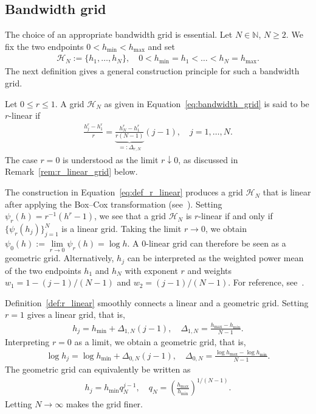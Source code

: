 \subsection{Bandwidth grid}

The choice of an appropriate bandwidth grid is essential. Let $N\in\mathbb{N}$, $N\ge2$. We fix the two endpoints $0<h_{\min}<h_{\max}$ and set
\begin{align}\label{eq:bandwidth_grid}
    \mathcal{H}_N:=\{h_1,\dots,h_N\},\quad0<h_{\min}=h_1<\dots<h_N=h_{\max}.
\end{align}
The next definition gives a general construction principle for such a bandwidth grid.

\begin{Def}\label{def:r_linear}
    Let $0\le r\le 1$. A grid $\mathcal{H}_N$ as given in Equation~\eqref{eq:bandwidth_grid} is said to be $r$-linear if
    \begin{align}\label{eq:def_r_linear}
        \frac{h_j^r-h_1^r}{r}=\underbrace{\frac{h_N^r-h_1^r}{r(N-1)}}_{=:\Delta_{r,N}}(j-1),\quad j=1,\dots,N.
    \end{align}
    The case $r=0$ is understood as the limit $r\downarrow0$, as discussed in Remark~\ref{rem:r_linear_grid} below.
\end{Def}

\begin{Rem}\label{rem:r_linear_grid}
    The construction in Equation~\eqref{eq:def_r_linear} produces a grid $\mathcal{H}_N$ that is linear after applying the Box--Cox transformation (see~\cite[Equation~(1)]{box_analysis_1964}). Setting $\psi_r(h)=r^{-1}(h^r-1)$, we see that a grid $\mathcal{H}_N$ is $r$-linear if and only if $\{\psi_r(h_j)\}_{j=1}^{N}$ is a linear grid. Taking the limit $r\to0$, we obtain $\psi_0(h):=\lim\limits_{r\to0}\psi_{r}(h)=\log{h}$. A $0$-linear grid can therefore be seen as a geometric grid. Alternatively, $h_j$ can be interpreted as the weighted power mean of the two endpoints $h_1$ and $h_N$ with exponent $r$ and weights $w_1=1-(j-1)/(N-1)$ and $w_2=(j-1)/(N-1)$. For reference, see~\cite[Chapter~III, Section~1]{bullen2013handbook}.
\end{Rem}

Definition~\ref{def:r_linear} smoothly connects a linear and a geometric grid. Setting $r=1$ gives a linear grid, that is,
\begin{align*}
    h_j=h_{\min}+\Delta_{1,N}(j-1),\quad\Delta_{1,N}=\frac{h_{\max}-h_{\min}}{N-1}.
\end{align*}
Interpreting $r=0$ as a limit, we obtain a geometric grid, that is,
\begin{align*}
    \log{h_j}=\log{h_{\min}}+\Delta_{0,N}(j-1),\quad\Delta_{0,N}=\frac{\log{h_{\max}}-\log{h_{\min}}}{N-1}.
\end{align*}
The geometric grid can equivalently be written as
\begin{align*}
    h_j=h_{\min}q_N^{j-1},\quad q_N=\left(\frac{h_{\max}}{h_{\min}}\right)^{1/(N-1)}.
\end{align*}
Letting $N\to\infty$ makes the grid finer.


